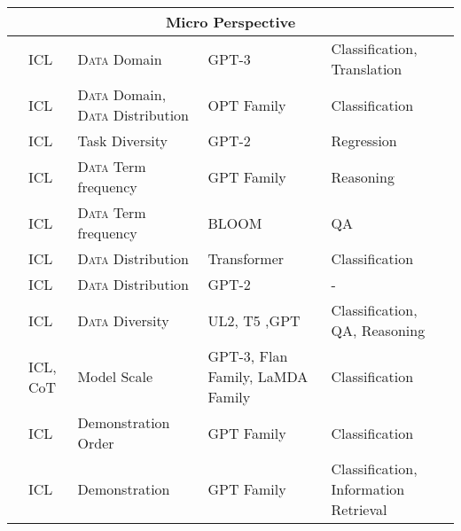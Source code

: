 \documentclass[11pt,a4paper]{article}
\begin{document}
\begin{table*}[t!]
{\begin{tabular}{lllll}
    	\midrule
    	\multicolumn{5}{c}{\textbf{Micro Perspective}}\\
    	\midrule 
            \citep{Shin2022OnTE} & ICL   &  \textsc{Data} Domain & GPT-3 & Classification, Translation \\
          \citep{Han2023UnderstandingIL} & ICL   &  \textsc{Data} Domain, \textsc{Data} Distribution & OPT Family & Classification \\
             \cite{Raventos2023PretrainingTD} & ICL & Task Diversity & GPT-2 & Regression \\
           \citep{Razeghi2022ImpactOP} & ICL   &  \textsc{Data} Term frequency & GPT Family & Reasoning \\
             \citep{Kandpal2022LargeLM} & ICL   &  \textsc{Data} Term frequency & BLOOM & QA \\
          \citep{Chan2022DataDP} & ICL   & \textsc{Data} Distribution & Transformer & Classification \\
          \citep{Wies2023TheLO} & ICL   & \textsc{Data} Distribution & GPT-2 & - \\
        \cite{Tay2022UnifyingLL} & ICL & \textsc{Data} Diversity & UL2, T5 ,GPT & Classification, QA, Reasoning \\
          \citep{Wei2022EmergentAO} & ICL, CoT   & Model Scale & GPT-3, Flan Family, LaMDA Family & Classification \\
          \citep{Lu2021FantasticallyOP} & ICL   & Demonstration Order & GPT Family & Classification \\
          \citep{Zhao2021CalibrateBU} & ICL   & Demonstration & GPT Family & Classification, Information Retrieval \\

\end{tabular}}
\end{table*}
\end{document}
